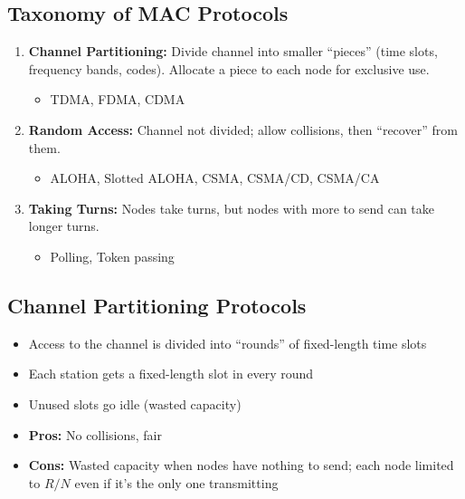 \subsection{Taxonomy of MAC Protocols}

\begin{keybox}
\begin{enumerate}
    \item \textbf{Channel Partitioning:} Divide channel into smaller ``pieces'' (time slots, frequency bands, codes). Allocate a piece to each node for exclusive use.
    \begin{itemize}[noitemsep]
        \item TDMA, FDMA, CDMA
    \end{itemize}

    \item \textbf{Random Access:} Channel not divided; allow collisions, then ``recover'' from them.
    \begin{itemize}[noitemsep]
        \item ALOHA, Slotted ALOHA, CSMA, CSMA/CD, CSMA/CA
    \end{itemize}

    \item \textbf{Taking Turns:} Nodes take turns, but nodes with more to send can take longer turns.
    \begin{itemize}[noitemsep]
        \item Polling, Token passing
    \end{itemize}
\end{enumerate}
\end{keybox}

\subsection{Channel Partitioning Protocols}

\begin{keybox}
\begin{itemize}[noitemsep]
    \item Access to the channel is divided into ``rounds'' of fixed-length time slots
    \item Each station gets a fixed-length slot in every round
    \item Unused slots go idle (wasted capacity)
    \item \textbf{Pros:} No collisions, fair
    \item \textbf{Cons:} Wasted capacity when nodes have nothing to send; each node limited to $R/N$ even if it's the only one transmitting
\end{itemize}
\end{keybox}

